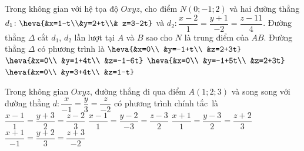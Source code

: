 \begin{ex}%
	Trong không gian với hệ tọa độ $Oxyz$, cho điểm $N(0;-1;2)$ và hai đường thẳng $d_1 \colon \heva{&x=1-t\\&y=2+t\\& z=3-2t}$ và  $d_2 \colon \dfrac{x-2}{1} = \dfrac{y+1}{-2} = \dfrac{z-11}{4}.$ Đường thẳng $\Delta$ cắt $d_1$, $d_2$ lần lượt tại $A$ và $B$ sao cho $N$ là trung điểm của $AB$. Đường thẳng $\Delta$ có phương trình là
	\choice 
		{$\heva{&x=0\\  &y=-1+t\\ &z=2+3t}$}
		{$\heva{&x=0\\ &y=1+4t\\ &z=-1-6t}$} 
		 {$\heva{&x=0\\ &y=-1+5t\\ &z=2+3t}$}
		{\True $\heva{&x=0\\ &y=3+4t\\ &z=1-t}$} 
\end{ex}

\begin{ex}%
	Trong không gian $Oxyz$, đường thẳng đi qua điểm $A(1;2;3)$ và  song song với đường thẳng $d\colon \dfrac{x}{-1}=\dfrac{y}{3}=\dfrac{z}{-2}$ có phương trình chính tắc~là
	\choice 
		 {$\dfrac{x-1}{1}=\dfrac{y+3}{2}=\dfrac{z-2}{3}$}
		{\True  $\dfrac{x-1}{1}=\dfrac{y-2}{-3}=\dfrac{z-3}{2}$}
		 {$\dfrac{x+1}{1}=\dfrac{y-3}{2}=\dfrac{z+2}{3}$}
		 {$\dfrac{x+1}{-1}=\dfrac{y+2}{3}=\dfrac{z+3}{-2}$}
\end{ex}

